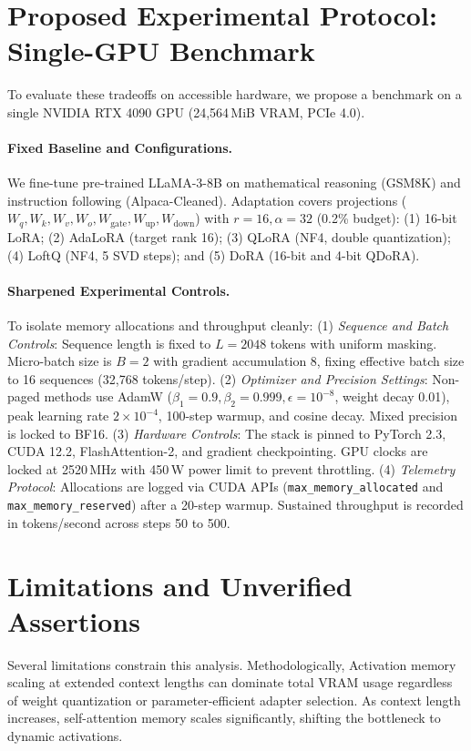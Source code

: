 \documentclass[11pt,a4paper]{article}
\begin{document}
\section{Proposed Experimental Protocol: Single-GPU Benchmark}
To evaluate these tradeoffs on accessible hardware, we propose a benchmark on a single NVIDIA RTX 4090 GPU (24,564\,MiB VRAM, PCIe 4.0).

\paragraph{Fixed Baseline and Configurations.} We fine-tune pre-trained LLaMA-3-8B on mathematical reasoning (GSM8K) and instruction following (Alpaca-Cleaned). Adaptation covers projections ($W_q, W_k, W_v, W_o, W_{\text{gate}}, W_{\text{up}}, W_{\text{down}}$) with $r = 16, \alpha = 32$ (0.2\% budget):
(1) 16-bit LoRA;
(2) AdaLoRA (target rank 16);
(3) QLoRA (NF4, double quantization);
(4) LoftQ (NF4, 5 SVD steps); and
(5) DoRA (16-bit and 4-bit QDoRA).

\paragraph{Sharpened Experimental Controls.} To isolate memory allocations and throughput cleanly:
(1) \textit{Sequence and Batch Controls}: Sequence length is fixed to $L = 2048$ tokens with uniform masking. Micro-batch size is $B = 2$ with gradient accumulation 8, fixing effective batch size to 16 sequences (32,768 tokens/step).
(2) \textit{Optimizer and Precision Settings}: Non-paged methods use AdamW ($\beta_1 = 0.9, \beta_2 = 0.999, \epsilon = 10^{-8}$, weight decay 0.01), peak learning rate $2 \times 10^{-4}$, 100-step warmup, and cosine decay. Mixed precision is locked to BF16.
(3) \textit{Hardware Controls}: The stack is pinned to PyTorch 2.3, CUDA 12.2, FlashAttention-2, and gradient checkpointing. GPU clocks are locked at 2520\,MHz with 450\,W power limit to prevent throttling.
(4) \textit{Telemetry Protocol}: Allocations are logged via CUDA APIs (\texttt{max\_memory\_allocated} and \texttt{max\_memory\_reserved}) after a 20-step warmup. Sustained throughput is recorded in tokens/second across steps 50 to 500.

\section{Limitations and Unverified Assertions}
Several limitations constrain this analysis. Methodologically, Activation memory scaling at extended context lengths can dominate total VRAM usage regardless of weight quantization or parameter-efficient adapter selection. As context length increases, self-attention memory scales significantly, shifting the bottleneck to dynamic activations.
\end{document}
